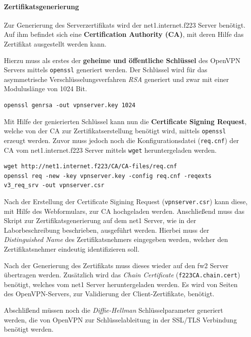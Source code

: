 \paragraph{Zertifikatsgenerierung}

Zur Generierung des Serverzertifikats wird der net1.internet.f223 Server benötigt. Auf ihm befindet sich eine \textbf{Certification Authority (CA)}, mit deren Hilfe das Zertifikat ausgestellt werden kann.

Hierzu muss als erstes der \textbf{geheime und öffentliche Schlüssel} des OpenVPN Servers mittels \texttt{openssl} generiert werden. Der Schlüssel wird für das asymmetrische Verschlüsselungsverfahren \emph{RSA} generiert und zwar mit einer Moduluslänge von 1024 Bit.

\begin{lstlisting}
openssl genrsa -out vpnserver.key 1024
\end{lstlisting}

Mit Hilfe der genierierten Schlüssel kann nun die \textbf{Certificate Signing Request}, welche von der CA zur Zertifikatserstellung benötigt wird, mittels \texttt{openssl} erzeugt werden. Zuvor muss jedoch noch die Konfigurationsdatei (\texttt{req.cnf}) der CA vom net1.internet.f223 Server mittels \texttt{wget} heruntergeladen werden.

\begin{lstlisting}
wget http://net1.internet.f223/CA/CA-files/req.cnf
openssl req -new -key vpnserver.key -config req.cnf -reqexts v3_req_srv -out vpnserver.csr
\end{lstlisting}

Nach der Erstellung der Certificate Sigining Request (\texttt{vpnserver.csr}) kann diese, mit Hilfe des Webformulars, zur CA hochgeladen werden.
Anschließend muss das Skript zur Zertifikatsgenerierung auf dem net1 Server, wie in der Laborbeschreibung beschrieben, ausgeführt werden. Hierbei muss der \emph{Distinguished Name} des Zertifikatsnehmers eingegeben werden, welcher den Zertifikatsnehmer eindeutig identifizieren soll.

Nach der Generierung des Zertifikats muss dieses wieder auf den fw2 Server übertragen werden. Zusätzlich wird das \emph{Chain Certificate} (\texttt{f223CA.chain.cert}) benötigt, welches vom net1 Server heruntergeladen werden. Es wird von Seiten des OpenVPN-Servers, zur Validierung der Client-Zertifikate, benötigt.

Abschlißend müssen noch die \emph{Diffie-Hellman} Schlüsselparameter generiert werden, die von OpenVPN zur Schlüsselableitung in der SSL/TLS Verbindung benötigt werden.

